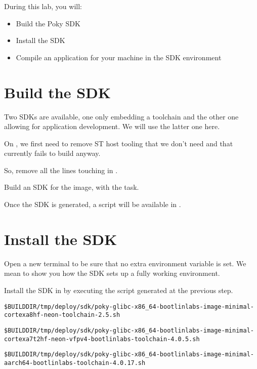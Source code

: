
During this lab, you will:
\begin{itemize}
  \item Build the Poky SDK
  \item Install the SDK
  \item Compile an application for your machine in the SDK
    environment
\end{itemize}

\section{Build the SDK}

Two SDKs are available, one only embedding a toolchain and the
other one allowing for application development. We will use the latter one
here.

\if{}
On , we first need to remove ST host tooling that we
don't need and that currently fails to build anyway.

So, remove all the lines touching  in
.
\fi

Build an SDK for the  image, with
the  task.

Once the SDK is generated, a script will be available in
.

\section{Install the SDK}

Open a new terminal to be sure that no extra environment variable is set.
We mean to show you how the SDK sets up a fully working environment.

Install the SDK in  by executing the script
generated at the previous step.

{\footnotesize
\if{}
\begin{verbatim}
$BUILDDIR/tmp/deploy/sdk/poky-glibc-x86_64-bootlinlabs-image-minimal-cortexa8hf-neon-toolchain-2.5.sh
\end{verbatim}
\fi
\if{}
\begin{verbatim}
$BUILDDIR/tmp/deploy/sdk/poky-glibc-x86_64-bootlinlabs-image-minimal-cortexa7t2hf-neon-vfpv4-bootlinlabs-toolchain-4.0.5.sh
\end{verbatim}
\fi
\if{}
\begin{verbatim}
$BUILDDIR/tmp/deploy/sdk/poky-glibc-x86_64-bootlinlabs-image-minimal-aarch64-bootlinlabs-toolchain-4.0.17.sh
\end{verbatim}
\fi
}

